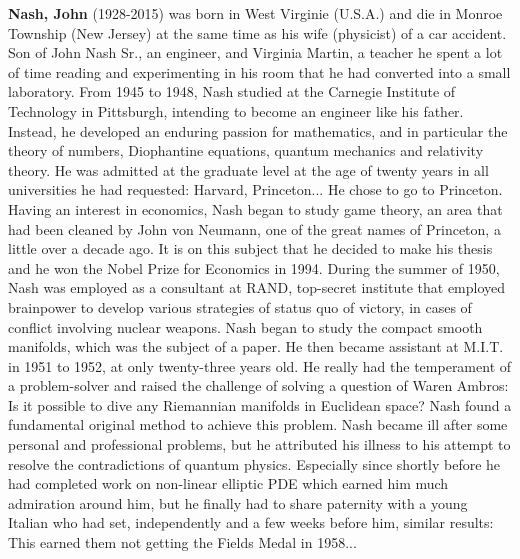 \textbf{Nash, John} (1928-2015) was born in West Virginie (U.S.A.) and die in Monroe Township (New Jersey) at the same time as his wife (physicist) of a car accident. Son of John Nash Sr., an engineer, and Virginia Martin, a teacher he spent a lot of time reading and experimenting in his room that he had converted into a small laboratory. From 1945 to  1948, Nash studied at the Carnegie Institute of Technology in Pittsburgh, intending to become an engineer like his father. Instead, he developed an enduring passion for mathematics, and in particular the theory of numbers, Diophantine equations, quantum mechanics and relativity theory. He was admitted at the graduate level at the age of twenty years in all universities he had requested: Harvard, Princeton... He chose to go to Princeton. Having an interest in economics, Nash began to study game theory, an area that had been cleaned by John von Neumann, one of the great names of Princeton, a little over a decade ago. It is on this subject that he decided to make his thesis and he won the Nobel Prize for Economics in 1994. During the summer of 1950, Nash was employed as a consultant at RAND, top-secret institute that employed brainpower to develop various strategies of status quo of victory, in cases of conflict involving nuclear weapons. Nash began to study the compact smooth manifolds, which was the subject of a paper. He then became assistant at M.I.T. in 1951 to 1952, at only twenty-three years old. He really had the temperament of a problem-solver and raised the challenge of solving a question of Waren Ambros: Is it possible to dive any Riemannian manifolds in Euclidean space? Nash found a fundamental original method to achieve this problem. Nash became ill after some personal and professional problems, but he attributed his illness to his attempt to resolve the contradictions of quantum physics. Especially since shortly before he had completed work on non-linear elliptic PDE which earned him much admiration around him, but he finally had to share paternity with a young Italian who had set, independently and a few weeks before him, similar results: This earned them not getting the Fields Medal in 1958...

